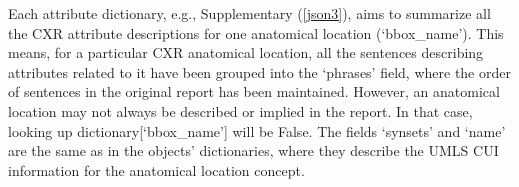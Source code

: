 
Each attribute dictionary, e.g., Supplementary  (\ref{json3}), aims to summarize all the CXR attribute descriptions for one anatomical location (`bbox\_name'). This means, for a particular CXR anatomical location, all the sentences describing attributes related to it have been grouped into the `phrases' field, where the order of sentences in the original report has been maintained. However, an anatomical location may not always be described or implied in the report. In that case, looking up dictionary[`bbox\_name'] will be False. The fields `synsets' and `name' are the same as in the objects' dictionaries, where they describe the UMLS CUI information for the anatomical location concept.

